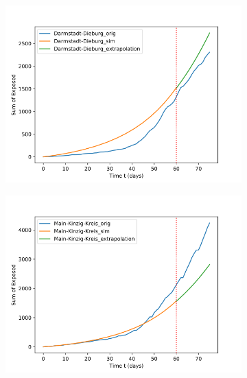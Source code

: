 \begin{figure}[h]
	\centering
	\begin{subfigure}[b]{0.3\textwidth}
		\centering
		\includegraphics[width=\textwidth]{./figures/60d/24_Darmstadt-Dieburg.png}	
		\caption{}
	\end{subfigure}
	\hfill
	\begin{subfigure}[b]{0.3\textwidth}
		\centering
		\includegraphics[width=\textwidth]{./figures/60d/13_Main-Kinzig-Kreis.png}	
		\caption{}
	\end{subfigure}
	\hfill
	\begin{subfigure}[b]{0.3\textwidth}
		\centering

\end{subfigure}
\end{figure}
